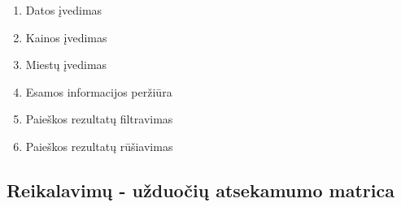 \documentclass{VUMIFPSkursinis}
\begin{document}
            \begin{enumerate}[label=U\arabic*.]
                \item Datos įvedimas
                \item Kainos įvedimas
                \item Miestų įvedimas
                \item Esamos informacijos peržiūra
                \item Paieškos rezultatų filtravimas
                \item Paieškos rezultatų rūšiavimas
            \end{enumerate}
  
        \subsection{Reikalavimų - užduočių atsekamumo matrica}
  
  

    \appendix  %
  
\end{document}
